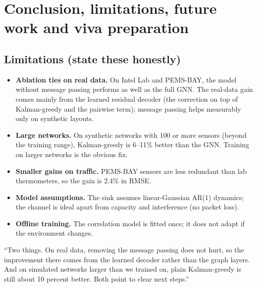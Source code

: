 \section{Conclusion, limitations, future work and viva preparation}

\subsection{Limitations (state these honestly)}
\begin{itemize}
  \item \textbf{Ablation ties on real data.} On Intel Lab and PEMS-BAY, the model without message passing performs as
        well as the full GNN. The real-data gain comes mainly from the learned residual decoder (the correction on top of
        Kalman-greedy and the pairwise term); message passing helps measurably only on synthetic layouts.
  \item \textbf{Large networks.} On synthetic networks with 100 or more sensors (beyond the training range), Kalman-greedy
        is 6--11\% better than the GNN. Training on larger networks is the obvious fix.
  \item \textbf{Smaller gains on traffic.} PEMS-BAY sensors are less redundant than lab thermometers, so the gain is
        2.4\% in RMSE.
  \item \textbf{Model assumptions.} The sink assumes linear-Gaussian AR(1) dynamics; the channel is ideal apart from
        capacity and interference (no packet loss).
  \item \textbf{Offline training.} The correlation model is fitted once; it does not adapt if the environment changes.
\end{itemize}

\begin{saybox}
``Two things. On real data, removing the message passing does not hurt, so the improvement there comes from the
learned decoder rather than the graph layers. And on simulated networks larger than we trained on, plain Kalman-greedy is
still about 10 percent better. Both point to clear next steps.''
\end{saybox}

